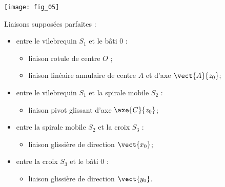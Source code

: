 
\begin{center}%
\texttt{[image: fig\_05]}
\end{center}



Liaisons supposées parfaites :
\begin{itemize} 
\item entre le vilebrequin $S_1$ et le bâti 0 :
\begin{itemize}
\item liaison rotule de centre $O$ ;
\item liaison linéaire annulaire de centre $A$ et d’axe $\vect{A}{z_0}$;
\end{itemize}
\item entre le vilebrequin $S_1$ et la spirale mobile $S_2$  :
\begin{itemize}
\item liaison pivot glissant d’axe $\axe{C}{z_0}$;
\end{itemize}
\item entre la spirale mobile $S_2$  et la croix $S_3$  :
\begin{itemize}
\item liaison glissière de direction $\vect{x_0}$;
\end{itemize}
\item entre la croix $S_3$ et le bâti 0 :
\begin{itemize}
\item liaison glissière de direction $\vect{y_0}$.
\end{itemize}
\end{itemize}

